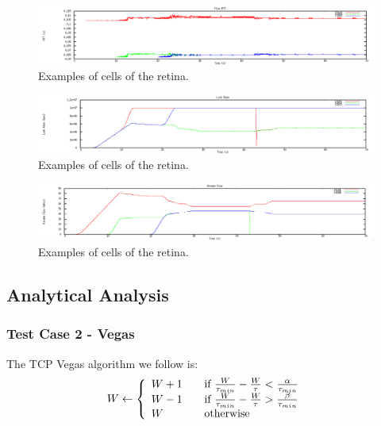 \documentclass[12pt]{article}
\begin{document}
\begin{figure}[!ht]
\centering \includegraphics[bb= 0 0 1300 250, scale=.35]{figures/Test2_Vegas/flow_rtt.png}
\caption{Examples of cells of the retina.}
\label{fig:test2_vegas_flow_rtt}
\end{figure}

\begin{figure}[!ht]
\centering \includegraphics[bb= 0 0 1300 250, scale=.35]{figures/Test2_Vegas/link_rate.png}
\caption{Examples of cells of the retina.}
\label{fig:test2_vegas_link_rate}
\end{figure}

\begin{figure}[!ht]
\centering \includegraphics[bb= 0 0 1300 250, scale=.35]{figures/Test2_Vegas/window_size.png}
\caption{Examples of cells of the retina.}
\label{fig:test2_vegas_window_size}
\end{figure}

\newpage

\subsection{Analytical Analysis}
\subsubsection{Test Case 2 - Vegas}


The TCP Vegas algorithm we follow is:
\[ W \leftarrow \left\{
  \begin{array}{l l}
    W+1 & \quad \text{if }\frac{W}{\tau_{min}} - \frac{W}{\tau} < \frac{\alpha}{\tau_{min}}\\
    W-1 & \quad \text{if }\frac{W}{\tau_{min}} - \frac{W}{\tau} > \frac{\beta}{\tau_{min}}\\
    W & \quad \text{otherwise}\\
  \end{array} \right.\]
\end{document}
